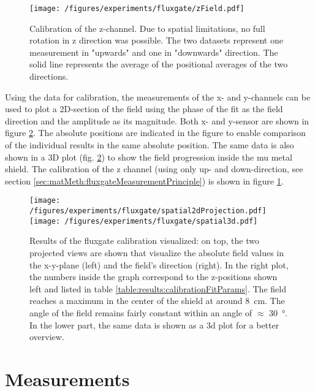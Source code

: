         \begin{figure}
            \centering
            \texttt{[image: /figures/experiments/fluxgate/zField.pdf]}
            \caption[Calibration results z]{Calibration of the z-channel. Due to spatial limitations, no full rotation in z direction was possible. The two datasets represent one measurement in "upwards" and one in "downwards" direction. The solid line represents the average of the positional averages of the two directions.}
            \label{fig:results:fluxgate:zcal}
        \end{figure}
        Using the data for calibration, the measurements of the x- and y-channels can be used to plot a 2D-section of the field using the phase of the fit as the field direction and the amplitude as its magnitude. Both x- and y-sensor are shown in figure \ref{fig:results:fluxgate:plotSpatial}. The absolute positions are indicated in the figure to enable comparison of the individual results in the same absolute position. The same data is also shown in a 3D plot (fig. \ref{fig:results:fluxgate:plotSpatial}) to show the field progression inside the mu metal shield. The calibration of the z channel (using only up- and down-direction, see section \ref{sec:matMeth:fluxgateMeasurementPrinciple}) is shown in figure \ref{fig:results:fluxgate:zcal}.
        \begin{figure}
            \centering
            \texttt{[image: /figures/experiments/fluxgate/spatial2dProjection.pdf]}
            \texttt{[image: /figures/experiments/fluxgate/spatial3d.pdf]}
            \caption[Fluxgate calibration]{Results of the fluxgate calibration visualized: on top, the two projected views are shown that visualize the absolute field values in the x-y-plane (left) and the field's direction (right). In the right plot, the numbers inside the graph correspond to the z-positions shown left and listed in table \ref{table:results:calibrationFitParams}. The field reaches a maximum in the center of the shield at around \SI{8}{\centi\meter}. The angle of the field remains fairly constant within an angle of $\approx$ \SI{30}{\degree}. In the lower part, the same data is shown as a 3d plot for a better overview.}
            \label{fig:results:fluxgate:plotSpatial}
        \end{figure}
\section{Measurements}
